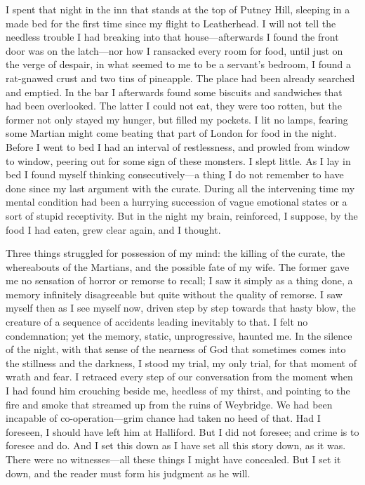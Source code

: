 

\lettrine[lines=4,findent=2pt]{I}{} spent that night in the inn that stands at the top of Putney Hill, sleeping in a made bed for the first time since my flight to Leatherhead. I will not tell the needless trouble I had breaking into that house—afterwards I found the front door was on the latch—nor how I ransacked every room for food, until just on the verge of despair, in what seemed to me to be a servant's bedroom, I found a rat-gnawed crust and two tins of pineapple. The place had been already searched and emptied. In the bar I afterwards found some biscuits and sandwiches that had been overlooked. The latter I could not eat, they were too rotten, but the former not only stayed my hunger, but filled my pockets. I lit no lamps, fearing some Martian might come beating that part of London for food in the night. Before I went to bed I had an interval of restlessness, and prowled from window to window, peering out for some sign of these monsters. I slept little. As I lay in bed I found myself thinking consecutively—a thing I do not remember to have done since my last argument with the curate. During all the intervening time my mental condition had been a hurrying succession of vague emotional states or a sort of stupid receptivity. But in the night my brain, reinforced, I suppose, by the food I had eaten, grew clear again, and I thought.

Three things struggled for possession of my mind: the killing of the curate, the whereabouts of the Martians, and the possible fate of my wife. The former gave me no sensation of horror or remorse to recall; I saw it simply as a thing done, a memory infinitely disagreeable but quite without the quality of remorse. I saw myself then as I see myself now, driven step by step towards that hasty blow, the creature of a sequence of accidents leading inevitably to that. I felt no condemnation; yet the memory, static, unprogressive, haunted me. In the silence of the night, with that sense of the nearness of God that sometimes comes into the stillness and the darkness, I stood my trial, my only trial, for that moment of wrath and fear. I retraced every step of our conversation from the moment when I had found him crouching beside me, heedless of my thirst, and pointing to the fire and smoke that streamed up from the ruins of Weybridge. We had been incapable of co-operation—grim chance had taken no heed of that. Had I foreseen, I should have left him at Halliford. But I did not foresee; and crime is to foresee and do. And I set this down as I have set all this story down, as it was. There were no witnesses—all these things I might have concealed. But I set it down, and the reader must form his judgment as he will.

